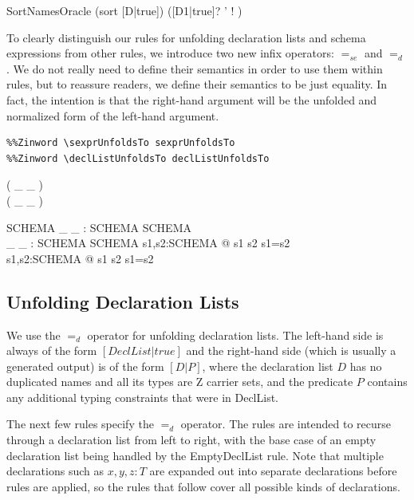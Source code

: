 \documentclass{entcs}
\newcommand{\sexprUnfoldsTo}{\mathrel{=_{se}}}
\newcommand{\declListUnfoldsTo}{\mathrel{=_d}}
\begin{document}
\begin{zedproviso}{SortNamesOracle}
  (sort [D|true]) \is ([D1|true]? \land [D2|true]' \land
                       [D3|true]! \land [D4|true])
\end{zedproviso}


To clearly distinguish our rules for unfolding declaration lists and
schema expressions from other rules, we introduce two new infix
operators: $\sexprUnfoldsTo$ and $\declListUnfoldsTo$.  
We do not really need to define their semantics in order to use them within
rules, but to reassure readers, we define their semantics to be just
equality.  In fact, the intention is that the right-hand argument
will be the unfolded and normalized form of the left-hand argument.

\begin{verbatim}
%%Zinword \sexprUnfoldsTo sexprUnfoldsTo
%%Zinword \declListUnfoldsTo declListUnfoldsTo
\end{verbatim}
%
\begin{zed}
  \relation ( \_ \sexprUnfoldsTo \_ ) \\
  \relation ( \_ \declListUnfoldsTo \_ )
\end{zed}
%
\begin{gendef}{SCHEMA}
  \_ \sexprUnfoldsTo \_ : SCHEMA \rel SCHEMA \\
  \_ \declListUnfoldsTo \_ : SCHEMA \rel SCHEMA
\where
  \forall s1,s2:SCHEMA @ s1 \sexprUnfoldsTo s2 \iff s1=s2 \\
  \forall s1,s2:SCHEMA @ s1 \declListUnfoldsTo s2 \iff s1=s2 \\
\end{gendef}


\subsection{Unfolding Declaration Lists}

We use the $\declListUnfoldsTo$ operator for unfolding declaration
lists.   The left-hand side is always of the form $[DeclList|true]$
and the right-hand side (which is usually a generated output) is
of the form $[D|P]$, where the declaration list $D$ has no duplicated
names and all its types are Z carrier sets, and the predicate $P$
contains any additional typing constraints that were in DeclList.

The next few rules specify the $\declListUnfoldsTo$ operator.
The rules are intended to recurse through a declaration list from left
to right, with the base case of an empty declaration list being handled
by the EmptyDeclList rule.  Note that multiple declarations such as
$x,y,z:T$ are expanded out into separate declarations before rules
are applied, so the rules that follow cover all possible kinds
of declarations.
\end{document}
